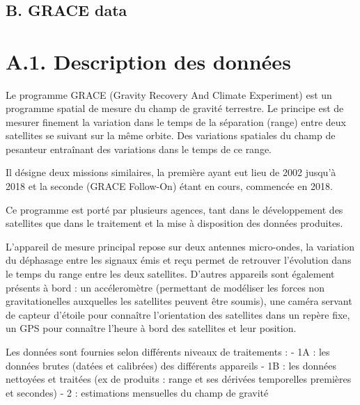 \documentclass[11pt]{article}
\begin{document}
    \begin{center}
    \end{center}
    { \hspace*{\fill} \\}
    
    \hypertarget{b.-grace-data}{%
\subsection{B. GRACE data}\label{b.-grace-data}}

\hypertarget{a.1.-description-des-donnuxe9es}{%
\section{A.1. Description des
données}\label{a.1.-description-des-donnuxe9es}}

Le programme GRACE (Gravity Recovery And Climate Experiment) est un
programme spatial de mesure du champ de gravité terrestre. Le principe
est de mesurer finement la variation dans le temps de la séparation
(range) entre deux satellites se suivant sur la même orbite. Des
variations spatiales du champ de pesanteur entraînant des variations
dans le temps de ce range.

Il désigne deux missions similaires, la première ayant eut lieu de 2002
jusqu'à 2018 et la seconde (GRACE Follow-On) étant en cours, commencée
en 2018.

Ce programme est porté par plusieurs agences, tant dans le développement
des satellites que dans le traitement et la mise à disposition des
données produites.

L'appareil de mesure principal repose sur deux antennes micro-ondes, la
variation du déphasage entre les signaux émis et reçu permet de
retrouver l'évolution dans le temps du range entre les deux satellites.
D'autres appareils sont également présents à bord : un accéleromètre
(permettant de modéliser les forces non gravitationelles auxquelles les
satellites peuvent être soumis), une caméra servant de capteur d'étoile
pour connaître l'orientation des satellites dans un repère fixe, un GPS
pour connaître l'heure à bord des satellites et leur position.

Les données sont fournies selon différents niveaux de traitements : - 1A
: les données brutes (datées et calibrées) des différents appareils - 1B
: les données nettoyées et traitées (ex de produits : range et ses
dérivées temporelles premières et secondes) - 2 : estimations mensuelles
du champ de gravité
\end{document}
